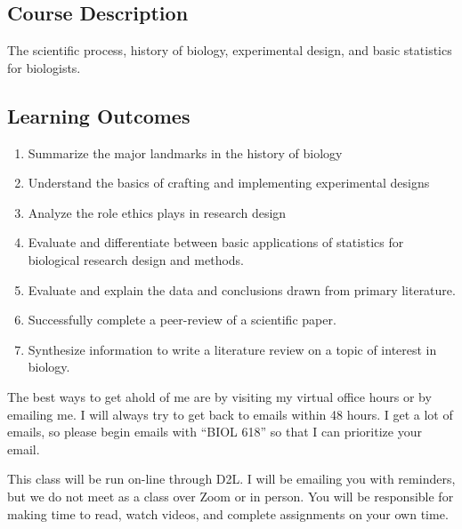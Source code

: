 \documentclass{tufte-handout}
\begin{document}
\begin{fullwidth}

\section{Course Description}

The scientific process, history of biology, experimental design, and basic statistics for biologists.

\subsection{Learning Outcomes}



\begin{enumerate}
	\item Summarize the major landmarks in the history of biology
\item Understand the basics of crafting and implementing experimental designs
\item Analyze the role ethics plays in research design
\item Evaluate and differentiate between basic applications of statistics for biological research design and methods.
\item Evaluate and explain the data and conclusions drawn from primary literature.
\item Successfully complete a peer-review of a scientific paper.
\item Synthesize information to write a literature review on a topic of interest in biology. 
\end{enumerate}




 The best ways to get ahold of me are by visiting my virtual office hours or by emailing me. I will always try to get back to emails within 48 hours. I get a lot of emails, so please begin emails with ``BIOL 618''  so that I can prioritize your email.

 This class will be run on-line through D2L. I will be emailing you with reminders, but we do not meet as a class over Zoom or in person. You will be responsible for making time to read, watch videos, and complete assignments on your own time.



\end{fullwidth}
\end{document}
